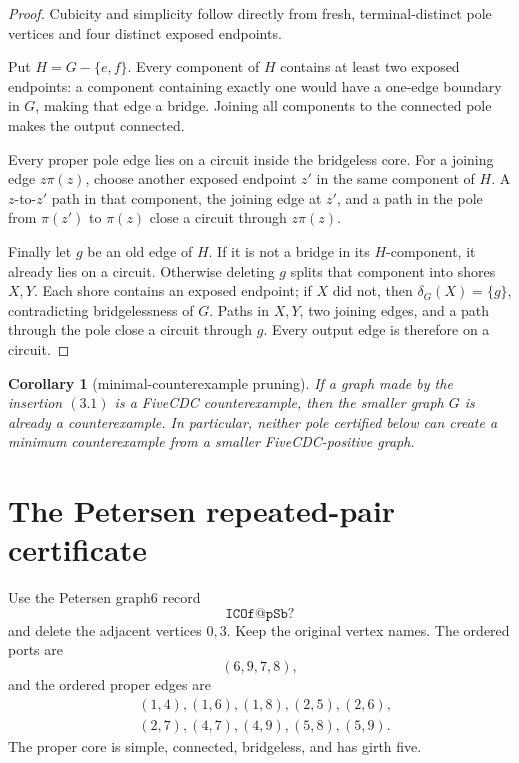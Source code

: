 \documentclass[11pt]{article}
\newtheorem{corollary}[theorem]{Corollary}
\theoremstyle{definition}
\theoremstyle{remark}
\begin{document}
\begin{proof}
Cubicity and simplicity follow directly from fresh, terminal-distinct pole
vertices and four distinct exposed endpoints.

Put \(H=G-\{e,f\}\).  Every component of \(H\) contains at least two
exposed endpoints: a component containing exactly one would have a
one-edge boundary in \(G\), making that edge a bridge.  Joining all
components to the connected pole makes the output connected.

Every proper pole edge lies on a circuit inside the bridgeless core.  For a
joining edge \(z\pi(z)\), choose another exposed endpoint \(z'\) in the
same component of \(H\).  A \(z\)-to-\(z'\) path in that component, the
joining edge at \(z'\), and a path in the pole from \(\pi(z')\) to
\(\pi(z)\) close a circuit through \(z\pi(z)\).

Finally let \(g\) be an old edge of \(H\).  If it is not a bridge in its
\(H\)-component, it already lies on a circuit.  Otherwise deleting \(g\)
splits that component into shores \(X,Y\).  Each shore contains an exposed
endpoint; if \(X\) did not, then \(\delta_G(X)=\{g\}\), contradicting
bridgelessness of \(G\).  Paths in \(X,Y\), two joining edges, and a path
through the pole close a circuit through \(g\).  Every output edge is
therefore on a circuit.
\end{proof}

\begin{corollary}[minimal-counterexample pruning]\label{cor:prune}
If a graph made by the insertion \((3.1)\) is a FiveCDC counterexample,
then the smaller graph \(G\) is already a counterexample.  In particular,
neither pole certified below can create a minimum counterexample from a
smaller FiveCDC-positive graph.
\end{corollary}

\section{The Petersen repeated-pair certificate}\label{sec:petersen}

Use the Petersen graph6 record
\[
                         \texttt{ICOf@pSb?}
\]
and delete the adjacent vertices \(0,3\).  Keep the original vertex names.
The ordered ports are
\[
                         (6,9,7,8),                       \tag{4.1}
\]
and the ordered proper edges are
\[
\begin{aligned}
 &(1,4),(1,6),(1,8),(2,5),(2,6),\\
 &(2,7),(4,7),(4,9),(5,8),(5,9).
\end{aligned}                                             \tag{4.2}
\]
The proper core is simple, connected, bridgeless, and has girth five.
\end{document}
